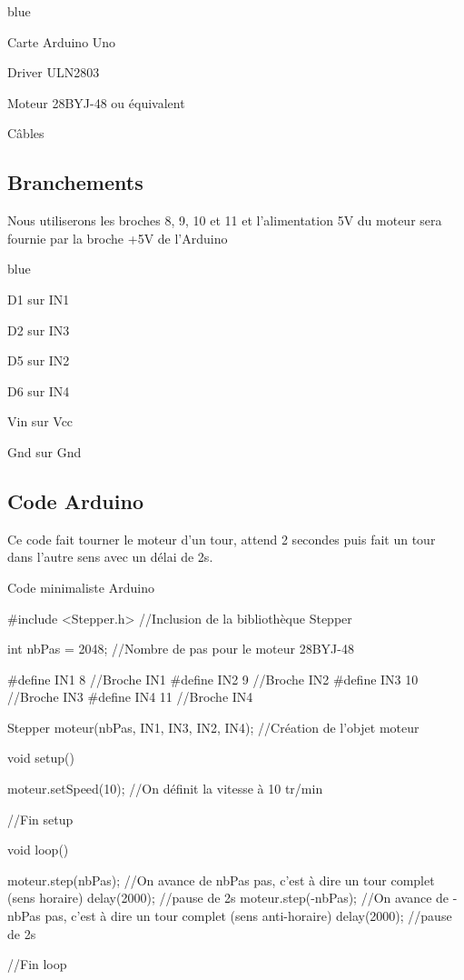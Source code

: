 \begin{items}{blue}{\Bullet}
  \item Carte Arduino Uno
  \item Driver ULN2803
  \item Moteur \pap 28BYJ-48 ou équivalent
  \item Câbles
\end{items}


\subsection{Branchements}

Nous utiliserons les broches 8, 9, 10 et 11 et  l'alimentation 5V du moteur sera fournie par la broche +5V de l'Arduino

\begin{items}{blue}{\Bullet}
  \item D1 sur IN1
  \item D2 sur IN3
  \item D5 sur IN2
  \item D6 sur IN4
  \item Vin sur Vcc
  \item Gnd sur Gnd
\end{items}


\subsection{Code Arduino}

Ce code fait tourner le moteur d'un tour, attend 2 secondes puis fait un tour dans l'autre sens avec un délai de 2s.

\begin{Cpp}{Code minimaliste Arduino}

#include <Stepper.h> //Inclusion de la bibliothèque Stepper

int nbPas = 2048; //Nombre de pas pour le moteur 28BYJ-48

#define IN1 8  //Broche IN1
#define IN2 9  //Broche IN2
#define IN3 10  //Broche IN3
#define IN4 11  //Broche IN4

Stepper moteur(nbPas, IN1, IN3, IN2, IN4); //Création de l'objet moteur
   
  void setup() {

    moteur.setSpeed(10); //On définit la vitesse à 10 tr/min

  }//Fin setup
   
  void loop() {

    moteur.step(nbPas);   //On avance de nbPas pas, c'est à dire un tour complet (sens horaire)
    delay(2000);          //pause de 2s
    moteur.step(-nbPas);  //On avance de -nbPas pas, c'est à dire un tour complet (sens anti-horaire)
    delay(2000);          //pause de 2s

  }//Fin loop
\end{Cpp} %


